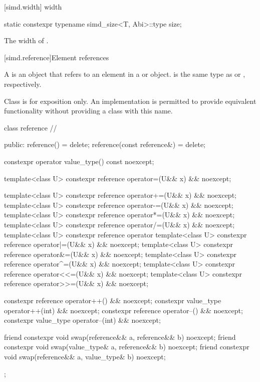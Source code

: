 [simd.width]{ width}

\begin{itemdecl}
static constexpr typename simd_size<T, Abi>::type size;
\end{itemdecl}

\begin{itemdescr}
  \pnum\returns
  The width of .
\end{itemdescr}

[simd.reference]{Element references}

\pnum
A  is an object that refers to an element in a  or  object.  is the same type as  or , respectively.

\pnum
Class  is for exposition only. An implementation is permitted to provide equivalent functionality without providing a class with this name.

\begin{codeblock}
class reference // \expos
{
public:
  reference() = delete;
  reference(const reference&) = delete;

  constexpr operator value_type() const noexcept;

  template<class U> constexpr reference operator=(U&& x) && noexcept;

  template<class U> constexpr reference operator+=(U&& x) && noexcept;
  template<class U> constexpr reference operator-=(U&& x) && noexcept;
  template<class U> constexpr reference operator*=(U&& x) && noexcept;
  template<class U> constexpr reference operator/=(U&& x) && noexcept;
  template<class U> constexpr reference operator%
  template<class U> constexpr reference operator|=(U&& x) && noexcept;
  template<class U> constexpr reference operator&=(U&& x) && noexcept;
  template<class U> constexpr reference operator^=(U&& x) && noexcept;
  template<class U> constexpr reference operator<<=(U&& x) && noexcept;
  template<class U> constexpr reference operator>>=(U&& x) && noexcept;

  constexpr reference operator++() && noexcept;
  constexpr value_type operator++(int) && noexcept;
  constexpr reference operator--() && noexcept;
  constexpr value_type operator--(int) && noexcept;

  friend constexpr void swap(reference&& a, reference&& b) noexcept;
  friend constexpr void swap(value_type& a, reference&& b) noexcept;
  friend constexpr void swap(reference&& a, value_type& b) noexcept;
};
\end{codeblock}

